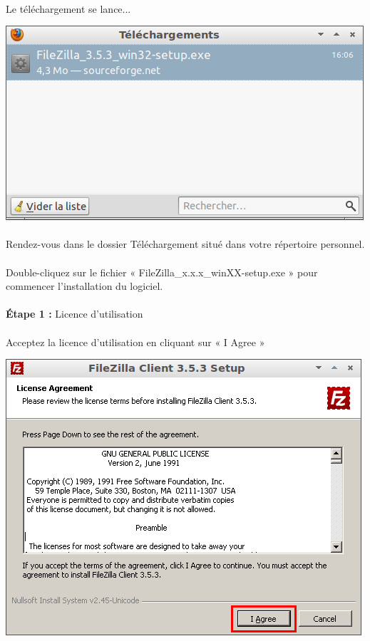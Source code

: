 \documentclass[10pt,a4paper]{article}
\begin{document}
\paragraph{}Le téléchargement se lance...
\begin{center}
\includegraphics[scale=0.5]{img/0015.png}
\end{center}
\paragraph{}Rendez-vous dans le dossier Téléchargement situé dans votre répertoire personnel.
\paragraph{}Double-cliquez sur le fichier « FileZilla\_x.x.x\_winXX-setup.exe » pour commencer l'installation du logiciel.
\paragraph{}\textbf{Étape 1 : }Licence d'utilisation
\paragraph{}Acceptez la licence d'utilisation en cliquant sur « I Agree »
\begin{center}
\includegraphics[scale=0.5]{img/0016.png}
\end{center}
\end{document}
